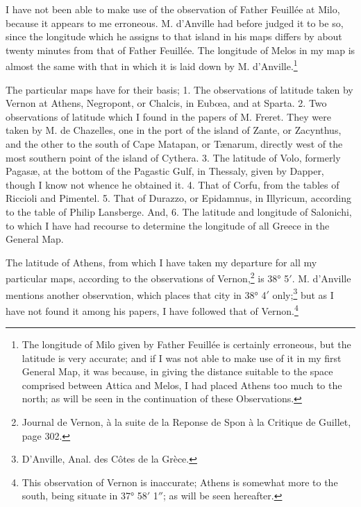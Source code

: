 \documentclass[a4paper, 11pt, oneside, polutonikogreek, english]{article}
\begin{document}
I have not been able to make use of the observation of Father Feuillée at Milo, because it appears to me erroneous. M. d'Anville had before judged it to be so, since the longitude which he assigns to that island in his maps differs by about twenty minutes from that of Father Feuillée. The longitude of Melos in my map is almost the same with that in which it is laid down by M. d'Anville.\footnote{The longitude of Milo given by Father Feuillée is certainly erroneous, but the latitude is very accurate; and if I was not able to make use of it in my first General Map, it was because, in giving the distance suitable to the space comprised between Attica and Melos, I had placed Athens too much to the north; as will be seen in the continuation of these Observations.}

The particular maps have for their basis; 1. The observations of latitude taken by Vernon at Athens, Negropont, or Chalcis, in Eubœa, and at Sparta. 2. Two observations of latitude which I found in the papers of M. Freret. They were taken by M. de Chazelles, one in the port of the island of Zante, or Zacynthus, and the other to the south of Cape Matapan, or Tænarum, directly west of the most southern point of the island of Cythera. 3. The latitude of Volo, formerly Pagasæ, at the bottom of the Pagastic Gulf, in Thessaly, given by Dapper, though I know not whence he obtained it. 4. That of Corfu, from the tables of Riccioli and Pimentel. 5. That of Durazzo, or Epidamnus, in Illyricum, according to the table of Philip Lansberge. And, 6. The latitude and longitude of Salonichi, to which I have had recourse to determine the longitude of all Greece in the General Map.

The latitude of Athens, from which I have taken my departure for all my particular maps, according to the observations of Vernon,\footnote{Journal de Vernon, à la suite de la Reponse de Spon à la Critique de Guillet, page 302.} is 38° 5$'$. M. d'Anville mentions another observation, which places that city in 38° 4$'$ only;\footnote{D'Anville, Anal. des Côtes de la Grèce.} but as I have not found it among his papers, I have followed that of Vernon.\footnote{This observation of Vernon is inaccurate; Athens is somewhat more to the south, being situate in 37° 58$'$ 1$''$; as will be seen hereafter.}
\end{document}
